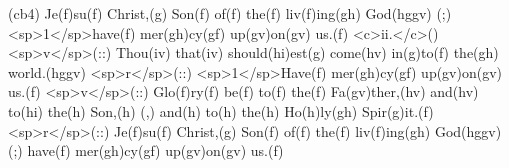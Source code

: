 (cb4) Je(f)su(f) Christ,(g) Son(f) of(f) the(f) liv(f)ing(gh) God(hggv) (;) <sp>1</sp>have(f) mer(gh)cy(gf) up(gv)on(gv) us.(f) <c>ii.</c>() <sp>v</sp>(::) Thou(iv) that(iv) should(hi)est(g) come(hv) in(g)to(f) the(gh) world.(hggv) <sp>r</sp>(::) <sp>1</sp>Have(f) mer(gh)cy(gf) up(gv)on(gv) us.(f) <sp>v</sp>(::) Glo(f)ry(f) be(f) to(f) the(f) Fa(gv)ther,(hv) and(hv) to(hi) the(h) Son,(h) (,) and(h) to(h) the(h) Ho(h)ly(gh) Spir(g)it.(f) <sp>r</sp>(::) Je(f)su(f) Christ,(g) Son(f) of(f) the(f) liv(f)ing(gh) God(hggv) (;) have(f) mer(gh)cy(gf) up(gv)on(gv) us.(f)